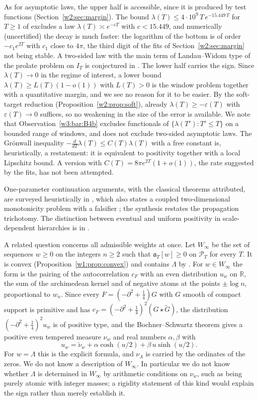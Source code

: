 \documentclass[11pt]{amsart}
\theoremstyle{definition}
\theoremstyle{remark}
\numberwithin{equation}{section}
\newcommand{\R}{\mathbb{R}}
\newcommand{\IT}{I_T}                                  %
\newcommand{\cF}{c_F}                                  %
\newcommand{\PT}{\mathcal{P}_T}                        %
\newcommand{\aT}{\mathfrak{a}_T}                       %
\newcommand{\lam}{\lambda(T)}                          %
\begin{document}
As for asymptotic laws, the upper half is accessible, since it is produced by test functions
(Section~\ref{w2:sec:margin}). The bound $\lam\le4\cdot10^{9}\,T\,e^{-15.449\,T}$ for $T\ge1$ of
\cite[Corollary~9.11]{P46} excludes a law $\lam\asymp e^{-cT}$ with $c<15.449$, and numerically (uncertified)
the decay is much faster: the logarithm of the bottom is of order $-c_1e^{2T}$ with $c_1$ close to $4\pi$, the
third digit of the fits of Section~\ref{w2:sec:margin} not being stable. A two-sided law with the main term of
Landau--Widom type of the prolate problem on $\IT$ is conjectured in \cite{Zhu2026}. The lower half carries the
sign. Since $\lam\to0$ in the regime of interest, a lower bound $\lam\ge L(T)(1-o(1))$ with $L(T)>0$ is the
window problem together with a quantitative margin, and we see no reason for it to be easier. By the soft-target
reduction (Proposition~\ref{w2:prop:soft}), already $\lam\ge-\varepsilon(T)$ with $\varepsilon(T)\to0$ suffices,
so no weakening in the size of the error is available. We note that Observation~\ref{w3:bar:B4b} excludes
functionals of $\{\lambda(T'):T'\le T\}$ on a bounded range of windows, and does not exclude two-sided asymptotic
laws. The Gr\"onwall inequality $-\frac{d}{dT}\lam\le C(T)\lam$ with a free constant is, heuristically, a restatement: it
is equivalent to positivity together with a local Lipschitz bound. A version with $C(T)=8\pi e^{2T}(1+o(1))$,
the rate suggested by the fits, has not been attempted.

One-parameter continuation arguments, with the classical theorems attributed, are surveyed heuristically in
\cite{P27}, which also states a coupled two-dimensional monotonicity problem with a falsifier
\cite[Problem~6.1]{P27}; the synthesis \cite{P29} restates the propagation trichotomy. The distinction between
eventual and uniform positivity in scale-dependent hierarchies is in \cite[Theorem~3.1]{P15}.

A related question concerns all admissible weights at once. Let $W_\infty$ be the set of sequences $w\ge0$ on
the integers $n\ge2$ such that $\aT[w]\ge0$ on $\PT$ for every $T$. It is convex
(Proposition~\ref{w1:prop:convex}) and contains $\Lambda$ by \cite[Corollary~16.3]{P46}. For $w\in W_\infty$ the
form is the pairing of the autocorrelation $\cF$ with an even distribution $u_w$ on $\R$, the sum of the
archimedean kernel and of negative atoms at the points $\pm\log n$, proportional to $w_n$. Since
every $F=(-\partial^2+\frac14)G$ with $G$ smooth of compact support is primitive and has
$\cF=(-\partial^2+\frac14)^2(G\star\widetilde G)$, the distribution $(-\partial^2+\frac14)^2u_w$ is of positive
type, and the Bochner--Schwartz theorem gives a positive even tempered measure $\nu_w$ and real numbers
$\alpha,\beta$ with
\[
u_w=\check\nu_w+\alpha\cosh(u/2)+\beta\,u\sinh(u/2).
\]
For $w=\Lambda$ this is the explicit formula, and $\nu_\Lambda$ is carried by the ordinates of the
zeros. We do not know a description of $W_\infty$. In particular we do not know whether $\Lambda$ is determined
in $W_\infty$ by arithmetic conditions on $\nu_w$, such as being purely atomic with integer masses; a rigidity
statement of this kind would explain the sign rather than merely establish it.
\end{document}
